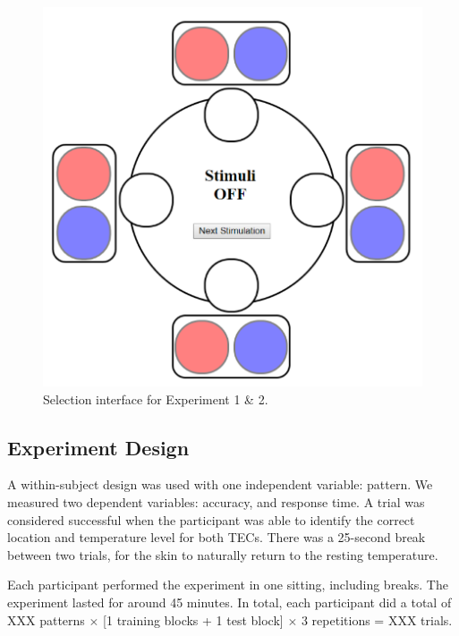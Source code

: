 \documentclass[preprint,12pt]{elsarticle}
\begin{document}
\begin{figure}[h]
  \centering
  \includegraphics[width=0.5\columnwidth]{img/fig10.pdf}
  \caption{Selection interface for Experiment 1 \& 2.}
  \label{fig:10}
\end{figure}

\subsection{Experiment Design}


A within-subject design was used with one independent variable: pattern. We measured two dependent variables: accuracy, and response time. A trial was considered successful when the participant was able to identify the correct location and temperature level for both TECs. There was a 25-second break between two trials, for the skin to naturally return to the resting temperature.

Each participant performed the experiment in one sitting, including breaks. The experiment lasted for around 45 minutes. In total, each participant did a total of XXX patterns $\times$ [1 training blocks + 1 test block] $\times$ 3 repetitions = XXX trials.
\end{document}
